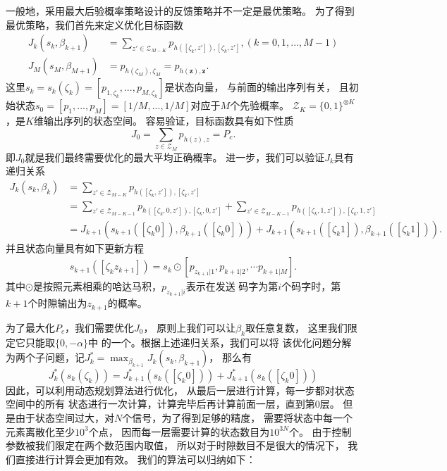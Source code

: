 一般地，采用最大后验概率策略设计的反馈策略并不一定是最优策略。
为了得到最优策略，我们首先来定义优化目标函数\cite{dalla2014adaptive}
\begin{equation}
\begin{split}
J_k(s_k, \beta_{k+1}) & = \sum_{z' \in \mathcal{Z}_{M-K}} p_{h([\zeta_{k}, z']), [\zeta_{k}, z']}, (k=0,1,...,M-1) \\
J_{M}(s_{M}, \beta_{M+1}) & =  p_{h(\zeta_M), \zeta_M} = p_{h(\bm{z}), \bm{z}}.
\end{split}
\label{eq:reward-to-go-function}
\end{equation}
这里$s_k =s_k(\zeta_{k}) = [p_{1,\zeta_{k}},...,p_{M,\zeta_{k}} ]$是状态向量，
与前面的输出序列有关，
且初始状态$s_0 = [p_1,  ..., p_M] = [1/M, ..., 1/M]$对应于$M$个先验概率。
$\mathcal{Z}_{K} = \{0, 1\}^{\otimes K}$，是$K$维输出序列的状态空间。
容易验证，目标函数具有如下性质
\begin{equation}
J_0 = \sum_{z\in \mathcal{Z}_M} p_{h(z),z} = P_c.
\end{equation}
即$J_0$就是我们最终需要优化的最大平均正确概率。
进一步，我们可以验证$J_k$具有递归关系
\begin{equation}
\begin{split}
J_k(s_k, \beta_k) & = \sum_{z' \in \mathcal{Z}_{M-K}} p_{h([\zeta_{k}, z']), [\zeta_{k}, z']} \\
                  & = \sum_{z' \in \mathcal{Z}_{M-K-1}} p_{h([\zeta_{k}, 0 , z']), [\zeta_{k}, 0 , z']} + \sum_{z' \in \mathcal{Z}_{M-K-1}} p_{h([\zeta_{k}, 1 , z']), [\zeta_{k}, 1 , z']} \\
                  & = J_{k+1}(s_{k+1}([\zeta_{k} 0]), \beta_{k+1}([\zeta_{k} 0])) + J_{k+1}(s_{k+1}([\zeta_{k} 1]), \beta_{k+1}([\zeta_{k} 1])).
\end{split}
\end{equation}
并且状态向量具有如下更新方程
\begin{equation}
\begin{split}
s_{k+1}([\zeta_{k} z_{k+1}]) = s_k \odot [p_{z_{k+1}|1}, p_{{k+1}|2}, \cdots p_{{k+1}|M}]. 
\end{split}
\label{eq:state-transform}
\end{equation}
其中$\odot$是按照元素相乘的哈达马积，$p_{z_{k+1}|i}$表示在发送
码字为第$i$个码字时，第$k+1$个时隙输出为$z_{k+1}$的概率。

为了最大化$P_c$，我们需要优化$J_0$，
原则上我们可以让$\beta_k$取任意复数，
这里我们限定它只能取$\{0, -\alpha\}$中
的一个。根据上述递归关系，我们可以将
该优化问题分解为两个子问题，记$J_k^* = \max_{\beta_{k+1}} J_k(s_k, \beta_{k+1})$，
那么有
\begin{equation}
J_k^*(s_k(\zeta_{k})) = J_{k+1}^*(s_k([\zeta_{k} 0])) + J_{k+1}^*(s_k([\zeta_{k} 0])) 
\end{equation}
因此，可以利用动态规划算法进行优化，
从最后一层进行计算，每一步都对状态空间中的所有
状态进行一次计算，计算完毕后再计算前面一层，直到第0层\cite{dalla2014adaptive}。
但是由于状态空间过大，对$N$个信号，为了得到足够的精度，
需要将状态中每一个元素离散化至少$10^3$个点，
因而每一层需要计算的状态数目为$10^{3N}$个。
由于控制参数被我们限定在两个数范围内取值，
所以对于时隙数目不是很大的情况下，
我们直接进行计算会更加有效。
我们的算法可以归纳如下：

